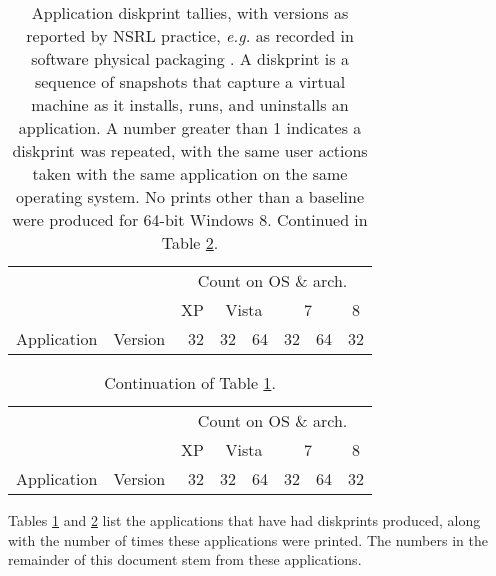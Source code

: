\documentclass[11pt]{ucthesis}
\theoremstyle{plain}
\theoremstyle{definition}
\newcommand{\eg}{\emph{e.g.}\xspace}
\begin{document}
\begin{table}[htp]
\caption{\label{tbl:diskprinteddata}Application diskprint tallies, with versions as reported by NSRL practice, \eg as recorded in software physical packaging \cite{white:aafs14}.  A diskprint is a sequence of snapshots that capture a virtual machine as it installs, runs, and uninstalls an application.  A number greater than 1 indicates a diskprint was repeated, with the same user actions taken with the same application on the same operating system.  No prints other than a baseline were produced for 64-bit Windows 8.  Continued in Table \ref{tbl:diskprinteddata:part2}.}
\begin{center}
\begin{small}
\begin{tabular}{p{}p{}rrrrrr}
\toprule
 & & \multicolumn{6}{c}{Count on OS \& arch.} \\
 & & \multicolumn{1}{c}{XP} & \multicolumn{2}{c}{Vista} & \multicolumn{2}{c}{7} & \multicolumn{1}{c}{8} \\
Application & Version & 32 & 32 & 64 & 32 & 64 & 32 \\
\midrule

\bottomrule
\end{tabular}
\end{small}
\end{center}
\end{table}%

\begin{table}[htp]
\caption{\label{tbl:diskprinteddata:part2}Continuation of Table \ref{tbl:diskprinteddata}.}
\begin{center}
\begin{small}
\begin{tabular}{p{}p{}rrrrrr}
\toprule
 & & \multicolumn{6}{c}{Count on OS \& arch.} \\
 & & \multicolumn{1}{c}{XP} & \multicolumn{2}{c}{Vista} & \multicolumn{2}{c}{7} & \multicolumn{1}{c}{8} \\
Application & Version & 32 & 32 & 64 & 32 & 64 & 32 \\
\midrule

\bottomrule
\end{tabular}
\end{small}
\end{center}
\end{table}%

Tables \ref{tbl:diskprinteddata} and \ref{tbl:diskprinteddata:part2} list the applications that have had diskprints produced, along with the number of times these applications were printed.  The numbers in the remainder of this document stem from these applications.
\end{document}
